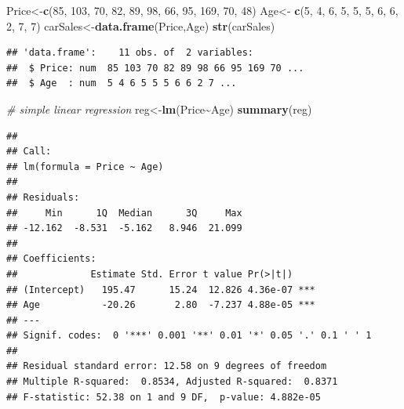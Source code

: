 \documentclass[
]{article}
\newenvironment{Shaded}{\begin{snugshade}}{\end{snugshade}}
\newcommand{\CommentTok}[1]{\textcolor[rgb]{0.56,0.35,0.01}{\textit{#1}}}
\newcommand{\DecValTok}[1]{\textcolor[rgb]{0.00,0.00,0.81}{#1}}
\newcommand{\FunctionTok}[1]{\textcolor[rgb]{0.13,0.29,0.53}{\textbf{#1}}}
\newcommand{\NormalTok}[1]{#1}
\newcommand{\OtherTok}[1]{\textcolor[rgb]{0.56,0.35,0.01}{#1}}
\newcommand{\SpecialCharTok}[1]{\textcolor[rgb]{0.81,0.36,0.00}{\textbf{#1}}}
\begin{document}
\begin{Shaded}
\begin{Highlighting}[]
\NormalTok{Price}\OtherTok{\textless{}{-}}\FunctionTok{c}\NormalTok{(}\DecValTok{85}\NormalTok{, }\DecValTok{103}\NormalTok{,  }\DecValTok{70}\NormalTok{,  }\DecValTok{82}\NormalTok{,  }\DecValTok{89}\NormalTok{,  }\DecValTok{98}\NormalTok{,  }\DecValTok{66}\NormalTok{,  }\DecValTok{95}\NormalTok{, }\DecValTok{169}\NormalTok{,  }\DecValTok{70}\NormalTok{,  }\DecValTok{48}\NormalTok{)}
\NormalTok{Age}\OtherTok{\textless{}{-}} \FunctionTok{c}\NormalTok{(}\DecValTok{5}\NormalTok{, }\DecValTok{4}\NormalTok{, }\DecValTok{6}\NormalTok{, }\DecValTok{5}\NormalTok{, }\DecValTok{5}\NormalTok{, }\DecValTok{5}\NormalTok{, }\DecValTok{6}\NormalTok{, }\DecValTok{6}\NormalTok{, }\DecValTok{2}\NormalTok{, }\DecValTok{7}\NormalTok{, }\DecValTok{7}\NormalTok{)}
\NormalTok{carSales}\OtherTok{\textless{}{-}}\FunctionTok{data.frame}\NormalTok{(Price,Age)}
\FunctionTok{str}\NormalTok{(carSales)}
\end{Highlighting}
\end{Shaded}

\begin{verbatim}
## 'data.frame':    11 obs. of  2 variables:
##  $ Price: num  85 103 70 82 89 98 66 95 169 70 ...
##  $ Age  : num  5 4 6 5 5 5 6 6 2 7 ...
\end{verbatim}

\begin{Shaded}
\begin{Highlighting}[]
\CommentTok{\# simple linear regression}
\NormalTok{reg}\OtherTok{\textless{}{-}}\FunctionTok{lm}\NormalTok{(Price}\SpecialCharTok{\textasciitilde{}}\NormalTok{Age)}
\FunctionTok{summary}\NormalTok{(reg)}
\end{Highlighting}
\end{Shaded}

\begin{verbatim}
## 
## Call:
## lm(formula = Price ~ Age)
## 
## Residuals:
##     Min      1Q  Median      3Q     Max 
## -12.162  -8.531  -5.162   8.946  21.099 
## 
## Coefficients:
##             Estimate Std. Error t value Pr(>|t|)    
## (Intercept)   195.47      15.24  12.826 4.36e-07 ***
## Age           -20.26       2.80  -7.237 4.88e-05 ***
## ---
## Signif. codes:  0 '***' 0.001 '**' 0.01 '*' 0.05 '.' 0.1 ' ' 1
## 
## Residual standard error: 12.58 on 9 degrees of freedom
## Multiple R-squared:  0.8534, Adjusted R-squared:  0.8371 
## F-statistic: 52.38 on 1 and 9 DF,  p-value: 4.882e-05
\end{verbatim}
\end{document}
